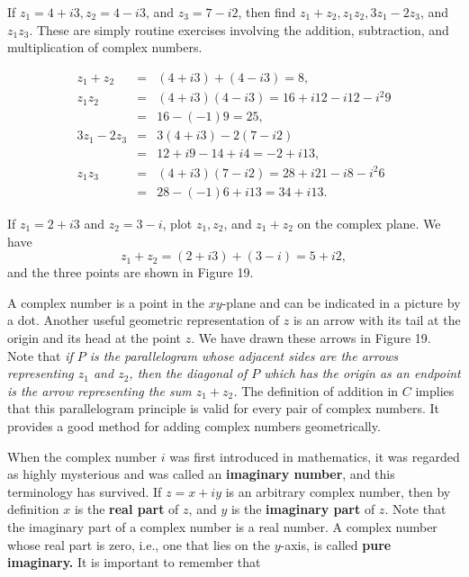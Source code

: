\begin{example}
 If $z_{1} = 4 + i3, z_{2} = 4 - i3$, and $z_{3} = 7 - i2$, then find $z_{1} + z_{2}, z_{1}z_{2}, 3z_{1} - 2z_{3}$, and $z_{1}z_{3}$. These are simply routine exercises involving the addition, subtraction, and multiplication of complex numbers.


\begin{eqnarray*}
   z_{1} + z_{2} &=& (4 + i3) + (4 - i3) = 8, \\
       z_{1}z_{2} &=& (4 + i3)(4 - i3) = 16 + i 12 - i 12 - i^{2}9 \\
                         &=& 16 - (-1) 9 = 25, \\
3z_{1} - 2z_{3} &=& 3(4 + i3) - 2(7 - i2) \\
                         &=& 12 + i9 - 14 + i4 = -2 + i13, \\
        z_{1}z_{3} &=& (4 + i3)(7 - i2) = 28 + i21 - i8 - i^{2}6\\
                          &=& 28 - (-1)6 + i 13 = 34 + i 13.
\end{eqnarray*}
\end{example}

\begin{example}
If $z_{1} = 2 + i3$ and $z_{2} = 3 - i$, plot $z_{1}, z_{2}$, and $z_{1} + z_{2}$ on the complex plane. We have
$$
z_{1} + z_{2} = (2+ i3) + (3 - i) = 5 + i2, 
$$
\noindent and the three points are shown in Figure 19.
\end{example}


A complex number is a point in the $xy$-plane and can be indicated in a picture by a dot. Another useful geometric representation of $z$ is an arrow with its tail at the origin and its head at the point $z$. We have drawn these arrows in Figure 19. Note that \textit{if $P$ is the parallelogram whose adjacent sides are the arrows representing $z_1$ and $z_2$, then the diagonal of $P$ which has the origin as an endpoint is the arrow representing the sum $z_{1} + z_{2}$.}  The definition of addition in $C$ implies that this parallelogram principle is valid for every pair of complex numbers. 
It provides a good method for adding complex numbers geometrically.

When the complex number $i$ was first introduced in mathematics, it was regarded as highly mysterious and was called an \textbf{imaginary number}, and this terminology has survived. If $z = x + iy$ is an arbitrary complex number, then by definition $x$ is the \textbf{real part} of $z$, and $y$ is the \textbf{imaginary part} of $z$. Note that the imaginary part of a complex number is a real number. A complex number whose real part is zero, i.e., one that lies on the $y$-axis, is called \textbf{pure imaginary.} It is important to remember that


